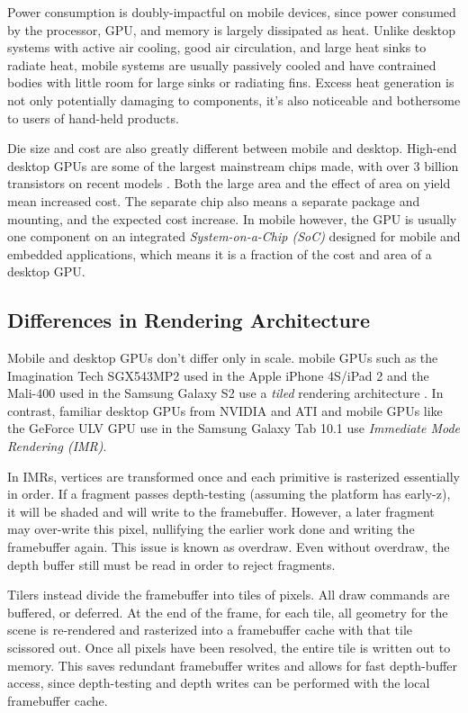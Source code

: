 Power consumption is doubly-impactful on mobile devices, since power consumed
by the processor, GPU, and memory is largely dissipated as heat.  Unlike
desktop systems with active air cooling, good air circulation, and large heat
sinks to radiate heat, mobile systems are usually passively cooled and have
contrained bodies with little room for large sinks or radiating fins.  Excess
heat generation is not only potentially damaging to components, it's also
noticeable and bothersome to users of hand-held products.

Die size and cost are also greatly different between mobile and desktop.
High-end desktop GPUs are some of the largest mainstream chips made, with over
3 billion transistors on recent models \cite{Walton10}.  Both the large area
and the effect of area on yield mean increased cost.  The separate chip also
means a separate package and mounting, and the expected cost increase.  In
mobile however, the GPU is usually one component on an integrated
\textit{System-on-a-Chip (SoC)} designed for mobile and embedded applications,
which means it is a fraction of the cost and area of a desktop GPU.

\subsection{Differences in Rendering Architecture}
\label{Jon-McCaffrey:differences-in-rendering-architecture}
  Mobile and desktop GPUs don't
differ only in scale.  mobile GPUs such as the Imagination Tech SGX543MP2 used
in the Apple iPhone 4S/iPad 2 and the Mali-400 used in the Samsung Galaxy S2
use a \textit{tiled} rendering architecture \cite{Klug11a}.  In
contrast, familiar desktop GPUs from NVIDIA and ATI and mobile GPUs like the
GeForce ULV GPU use in the Samsung Galaxy Tab 10.1 use \textit{Immediate Mode
Rendering (IMR)}.

In IMRs, vertices are transformed once and each primitive is rasterized
essentially in order.  If a fragment passes depth-testing (assuming the
platform has early-z), it will be shaded and will write to the framebuffer.
However, a later fragment may over-write this pixel, nullifying the earlier
work done and writing the framebuffer again.  This issue is known as overdraw.
Even without overdraw, the depth buffer still must be read in order to reject
fragments.

Tilers instead divide the framebuffer into tiles of pixels.  All draw commands
are buffered, or deferred.  At the end of the frame, for each tile, all
geometry for the scene is re-rendered and rasterized into a framebuffer cache
with that tile scissored out.  Once all pixels have been resolved, the entire
tile is written out to memory.  This saves redundant framebuffer writes and
allows for fast depth-buffer access, since depth-testing and depth writes can
be performed with the local framebuffer cache.

